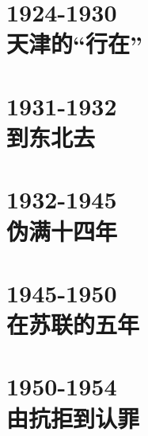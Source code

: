 \documentclass[twoside,openright,headings=optiontohead]{scrbook}
\begin{document}
{\part{1924-1930\\\hspace{1cm}天津的“行在”}







\part{1931-1932\\\hspace{1cm}到东北去}







\part{1932-1945\\\hspace{1cm}伪满十四年}










\part{1945-1950\\\hspace{1cm}在苏联的五年}



\part{1950-1954\\\hspace{1cm}由抗拒到认罪}











}
\end{document}
